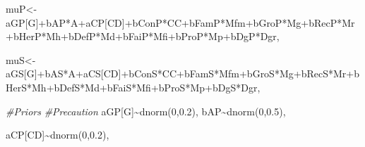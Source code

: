 \documentclass[
]{book}
\newenvironment{Shaded}{\begin{snugshade}}{\end{snugshade}}
\newcommand{\CommentTok}[1]{\textcolor[rgb]{0.56,0.35,0.01}{\textit{#1}}}
\newcommand{\DecValTok}[1]{\textcolor[rgb]{0.00,0.00,0.81}{#1}}
\newcommand{\FloatTok}[1]{\textcolor[rgb]{0.00,0.00,0.81}{#1}}
\newcommand{\FunctionTok}[1]{\textcolor[rgb]{0.00,0.00,0.00}{#1}}
\newcommand{\NormalTok}[1]{#1}
\newcommand{\OtherTok}[1]{\textcolor[rgb]{0.56,0.35,0.01}{#1}}
\newcommand{\SpecialCharTok}[1]{\textcolor[rgb]{0.00,0.00,0.00}{#1}}
\begin{document}
\begin{Shaded}
\begin{Highlighting}[]
\NormalTok{    muP}\OtherTok{\textless{}{-}}\NormalTok{aGP[G]}\SpecialCharTok{+}\NormalTok{bAP}\SpecialCharTok{*}\NormalTok{A}\SpecialCharTok{+}\NormalTok{aCP[CD]}\SpecialCharTok{+}\NormalTok{bConP}\SpecialCharTok{*}\NormalTok{CC}\SpecialCharTok{+}\NormalTok{bFamP}\SpecialCharTok{*}\NormalTok{Mfm}\SpecialCharTok{+}\NormalTok{bGroP}\SpecialCharTok{*}\NormalTok{Mg}\SpecialCharTok{+}\NormalTok{bRecP}\SpecialCharTok{*}\NormalTok{Mr}\SpecialCharTok{+}\NormalTok{bHerP}\SpecialCharTok{*}\NormalTok{Mh}\SpecialCharTok{+}\NormalTok{bDefP}\SpecialCharTok{*}\NormalTok{Md}\SpecialCharTok{+}\NormalTok{bFaiP}\SpecialCharTok{*}\NormalTok{Mfi}\SpecialCharTok{+}\NormalTok{bProP}\SpecialCharTok{*}\NormalTok{Mp}\SpecialCharTok{+}\NormalTok{bDgP}\SpecialCharTok{*}\NormalTok{Dgr,}
    
\NormalTok{    muS}\OtherTok{\textless{}{-}}\NormalTok{aGS[G]}\SpecialCharTok{+}\NormalTok{bAS}\SpecialCharTok{*}\NormalTok{A}\SpecialCharTok{+}\NormalTok{aCS[CD]}\SpecialCharTok{+}\NormalTok{bConS}\SpecialCharTok{*}\NormalTok{CC}\SpecialCharTok{+}\NormalTok{bFamS}\SpecialCharTok{*}\NormalTok{Mfm}\SpecialCharTok{+}\NormalTok{bGroS}\SpecialCharTok{*}\NormalTok{Mg}\SpecialCharTok{+}\NormalTok{bRecS}\SpecialCharTok{*}\NormalTok{Mr}\SpecialCharTok{+}\NormalTok{bHerS}\SpecialCharTok{*}\NormalTok{Mh}\SpecialCharTok{+}\NormalTok{bDefS}\SpecialCharTok{*}\NormalTok{Md}\SpecialCharTok{+}\NormalTok{bFaiS}\SpecialCharTok{*}\NormalTok{Mfi}\SpecialCharTok{+}\NormalTok{bProS}\SpecialCharTok{*}\NormalTok{Mp}\SpecialCharTok{+}\NormalTok{bDgS}\SpecialCharTok{*}\NormalTok{Dgr,}
    
    \CommentTok{\#Priors}
    \CommentTok{\#Precaution}
\NormalTok{    aGP[G]}\SpecialCharTok{\textasciitilde{}}\FunctionTok{dnorm}\NormalTok{(}\DecValTok{0}\NormalTok{,}\FloatTok{0.2}\NormalTok{),}
\NormalTok{    bAP}\SpecialCharTok{\textasciitilde{}}\FunctionTok{dnorm}\NormalTok{(}\DecValTok{0}\NormalTok{,}\FloatTok{0.5}\NormalTok{),}
    
\NormalTok{    aCP[CD]}\SpecialCharTok{\textasciitilde{}}\FunctionTok{dnorm}\NormalTok{(}\DecValTok{0}\NormalTok{,}\FloatTok{0.2}\NormalTok{),}
    

\end{Highlighting}
\end{Shaded}
\end{document}
